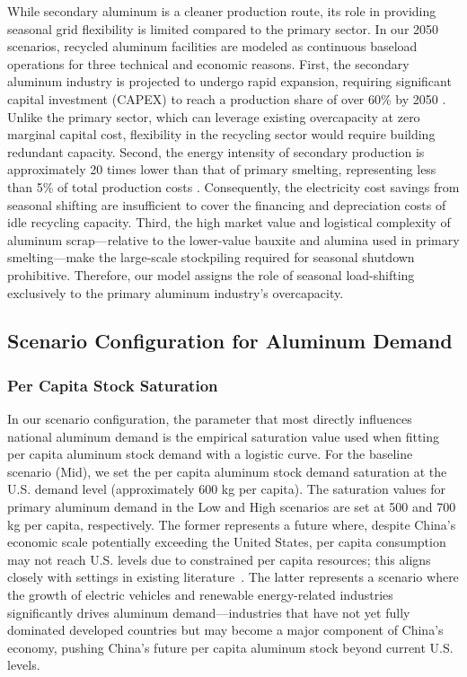 \documentclass[preprint,12pt]{elsarticle}
\begin{document}
While secondary aluminum is a cleaner production route, its role in providing seasonal grid flexibility is limited compared to the primary sector. In our 2050 scenarios, recycled aluminum facilities are modeled as continuous baseload operations for three technical and economic reasons. First, the secondary aluminum industry is projected to undergo rapid expansion, requiring significant capital investment (CAPEX) to reach a production share of over 60\% by 2050 \citep{li_when_2020}. Unlike the primary sector, which can leverage existing overcapacity at zero marginal capital cost, flexibility in the recycling sector would require building redundant capacity. Second, the energy intensity of secondary production is approximately 20 times lower than that of primary smelting, representing less than 5\% of total production costs \citep{peng_life_2022}. Consequently, the electricity cost savings from seasonal shifting are insufficient to cover the financing and depreciation costs of idle recycling capacity. Third, the high market value and logistical complexity of aluminum scrap—relative to the lower-value bauxite and alumina used in primary smelting—make the large-scale stockpiling required for seasonal shutdown prohibitive. Therefore, our model assigns the role of seasonal load-shifting exclusively to the primary aluminum industry's overcapacity.


\subsection{Scenario Configuration for Aluminum Demand}

\subsubsection{Per Capita Stock Saturation}
In our scenario configuration, the parameter that most directly influences national aluminum demand is the empirical saturation value used when fitting per capita aluminum stock demand with a logistic curve. For the baseline scenario (Mid), we set the per capita aluminum stock demand saturation at the U.S. demand level (approximately 600 kg per capita). The saturation values for primary aluminum demand in the Low and High scenarios are set at 500 and 700 kg per capita, respectively. The former represents a future where, despite China's economic scale potentially exceeding the United States, per capita consumption may not reach U.S. levels due to constrained per capita resources; this aligns closely with settings in existing literature~\citep{yang_supply_2024}. The latter represents a scenario where the growth of electric vehicles and renewable energy-related industries significantly drives aluminum demand—industries that have not yet fully dominated developed countries but may become a major component of China's economy, pushing China's future per capita aluminum stock beyond current U.S. levels.
\end{document}
